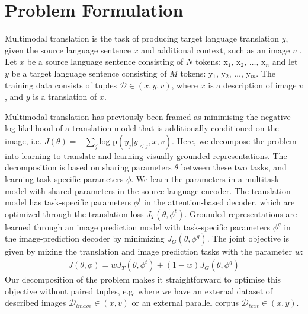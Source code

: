 \section{Problem Formulation}\label{sec:problem}

Multimodal translation is the task of producing target language translation $y$, given the source language sentence $x$ and additional context, such as an image $v$ \cite{Specia2016}. Let $x$ be a source language sentence consisting of $N$ tokens: x$_1$, x$_2$, $\ldots$, x$_n$ and let $y$ be a target language sentence consisting of $M$ tokens: y$_1$, y$_2$, $\ldots$, y$_m$. The training data consists of tuples $\mathcal{D} \in (x, y, v)$, where $x$ is a description of image $v$, and $y$ is a translation of $x$.

Multimodal translation has previously been framed as minimising the negative log-likelihood of a translation model that is additionally conditioned on the image, i.e. $J(\theta) = - \sum_{j} \text{log p}(y_j|y_{<j}, x, v)$. Here, we decompose the problem into learning to translate and learning visually grounded representations. The decomposition is based on sharing parameters $\theta$ between these two tasks, and learning task-specific parameters $\phi$. We learn the parameters in a multitask model with shared parameters in the source language encoder. The translation model has task-specific parameters $\phi^t$ in the attention-based decoder, which are optimized through the translation loss $J_{T}(\theta, \phi^t)$.
Grounded representations are learned through an image prediction model with task-specific parameters $\phi^g$ in the image-prediction
decoder by minimizing $J_{G}(\theta, \phi^g)$. The joint objective is given by mixing the translation and image prediction tasks with the parameter $w$:
%
\begin{align}
	J(\theta, \phi) = w J_{T}(\theta, \phi^{t}) +  (1 - w) J_G(\theta, \phi^{g})
\end{align}
%
Our decomposition of the problem makes it straightforward to optimise this objective without paired tuples, e.g. where we have an external dataset of described images $\mathcal{D}_{image} \in (x, v)$ or an external parallel corpus $\mathcal{D}_{text} \in (x, y)$.


